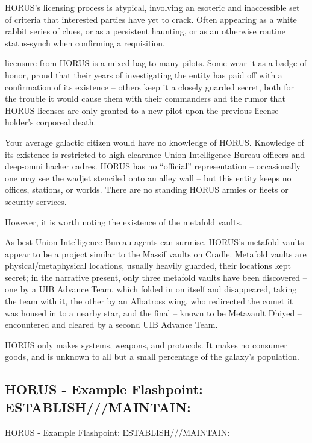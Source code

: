 HORUS’s licensing process is atypical, involving an esoteric and inaccessible set of criteria that  
interested parties have yet to crack. Often appearing as a white rabbit series of clues, or as a   
persistent haunting, or as an otherwise routine status-synch when confirming a requisition,  

                                                                                                                     


licensure from HORUS is a mixed bag to many pilots. Some wear it as a badge of honor, proud  
that their years of investigating the entity has paid off with a confirmation of its existence -- others  
keep it a closely guarded secret, both for the trouble it would cause them with their commanders  
and the rumor that HORUS licenses are only granted to a new pilot upon the previous license- 
holder’s corporeal death.     

Your average galactic citizen would have no knowledge of HORUS. Knowledge of its existence is  
restricted to high-clearance Union Intelligence Bureau officers and deep-omni hacker cadres.  
HORUS has no “official” representation -- occasionally one may see the wadjet stenciled onto an  
alley wall -- but this entity keeps no offices, stations, or worlds. There are no standing HORUS  
armies or fleets or security services.   

However, it is worth noting the existence of the metafold vaults.   

As best Union Intelligence Bureau agents can surmise, HORUS’s metafold vaults appear to be a  
project similar to the Massif vaults on Cradle. Metafold vaults are physical/metaphysical locations,  
usually heavily guarded, their locations kept secret; in the narrative present, only three metafold  
vaults have been discovered -- one by a UIB Advance Team, which folded in on itself and  
disappeared, taking the team with it, the other by an Albatross wing, who redirected the comet it  
was housed in to a nearby star, and the final -- known to be Metavault Dhiyed -- encountered and  
cleared by a second UIB Advance Team.     

HORUS only makes systems, weapons, and protocols. It makes no consumer goods, and is  
unknown to all but a small percentage of the galaxy’s population.   
\subsection{HORUS - Example Flashpoint: ESTABLISH///MAINTAIN:}
HORUS - Example Flashpoint: ESTABLISH///MAINTAIN:  

